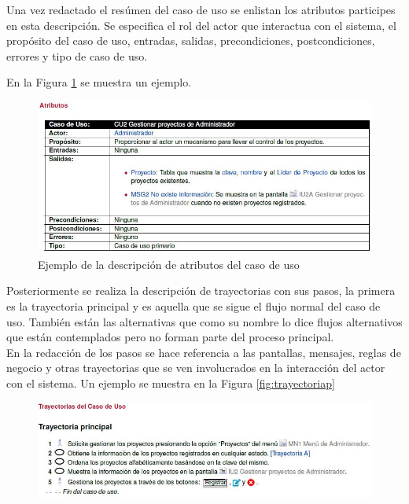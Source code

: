 Una vez redactado el resúmen del caso de uso se enlistan los atributos participes en esta descripción. Se especifica el rol del actor que interactua con el sistema, el propósito del caso de uso, entradas, salidas, precondiciones, postcondiciones, errores y tipo de caso de uso.

En la Figura \ref{fig:atri} se muestra un ejemplo.

\begin{figure}[H]
	\begin{center}
		\includegraphics[width=1\textwidth]{images/marcoteorico/atributos}
		\caption{Ejemplo de la descripción de atributos del caso de uso}
		\label{fig:atri}
	\end{center}
\end{figure}

Posteriormente se realiza la descripción de trayectorias con sus pasos, la primera es la trayectoria principal y es aquella que se sigue el flujo normal del caso de uso. También están las alternativas que como su nombre lo dice flujos alternativos que están contemplados pero no forman parte del proceso principal.\\

En la redacción de los pasos se hace referencia a las pantallas, mensajes, reglas de negocio y otras trayectorias que se ven involucrados en la interacción del actor con el sistema.
Un ejemplo se muestra en la Figura \ref{fig:trayectoriap}

\begin{figure}[H]
	\begin{center}
		\includegraphics[width=1\textwidth]{images/marcoteorico/trayectorias}
	\end{center}
\end{figure}

